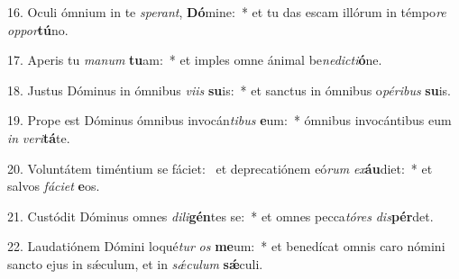 16. Oculi ómnium in te \textit{spe}\textit{rant}, \textbf{Dó}mine:~*  et tu das escam illórum in témpo\textit{re} \textit{op}\textit{por}\textbf{tú}no.\

17. Aperis tu \textit{ma}\textit{num} \textbf{tu}am:~*  et imples omne ánimal be\textit{ne}\textit{dic}\textit{ti}\textbf{ó}ne.\

18. Justus Dóminus in ómnibus \textit{vi}\textit{is} \textbf{su}is:~*  et sanctus in ómnibus o\textit{pé}\textit{ri}\textit{bus} \textbf{su}is.\

19. Prope est Dóminus ómnibus invocán\textit{ti}\textit{bus} \textbf{e}um:~*  ómnibus invocántibus eum \textit{in} \textit{ve}\textit{ri}\textbf{tá}te.\

20. Voluntátem timéntium se fáciet: \dag\  et deprecatiónem eó\textit{rum} \textit{ex}\textbf{áu}diet:~*  et salvos \textit{fá}\textit{ci}\textit{et} \textbf{e}os.\

21. Custódit Dóminus omnes \textit{di}\textit{li}\textbf{gén}tes se:~*  et omnes pecca\textit{tó}\textit{res} \textit{dis}\textbf{pér}det.\

22. Laudatiónem Dómini loqué\textit{tur} \textit{os} \textbf{me}um:~*  et benedícat omnis caro nómini sancto ejus in sǽculum, et in \textit{sǽ}\textit{cu}\textit{lum} \textbf{sǽ}culi.\

